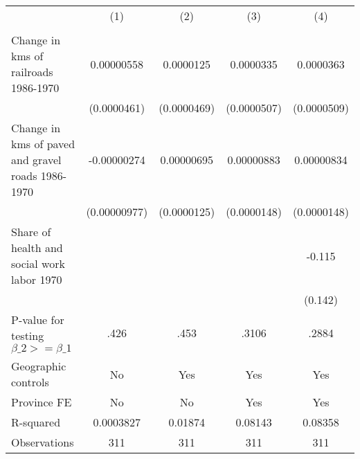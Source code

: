 {
\def\sym#1{\ifmmode^{#1}\else\(^{#1}\)\fi}
\begin{tabular}{l*{4}{c}}
\hline\hline
                &\multicolumn{1}{c}{(1)}&\multicolumn{1}{c}{(2)}&\multicolumn{1}{c}{(3)}&\multicolumn{1}{c}{(4)}\\
                &\multicolumn{1}{c}{}&\multicolumn{1}{c}{}&\multicolumn{1}{c}{}&\multicolumn{1}{c}{}\\
\hline
Change in kms of railroads 1986-1970&0.00000558         &0.0000125         &0.0000335         &0.0000363         \\
                &(0.0000461)         &(0.0000469)         &(0.0000507)         &(0.0000509)         \\
[1em]
Change in kms of paved and gravel roads 1986-1970&-0.00000274         &0.00000695         &0.00000883         &0.00000834         \\
                &(0.00000977)         &(0.0000125)         &(0.0000148)         &(0.0000148)         \\
[1em]
Share of health and social work labor 1970&                  &                  &                  &   -0.115         \\
                &                  &                  &                  &  (0.142)         \\
\hline
P-value for testing $\beta\_{2} >= \beta\_{1}$&     .426         &     .453         &    .3106         &    .2884         \\
Geographic controls&       No         &      Yes         &      Yes         &      Yes         \\
Province FE     &       No         &       No         &      Yes         &      Yes         \\
R-squared       &0.0003827         &  0.01874         &  0.08143         &  0.08358         \\
Observations    &      311         &      311         &      311         &      311         \\
\hline\hline
\end{tabular}
}
